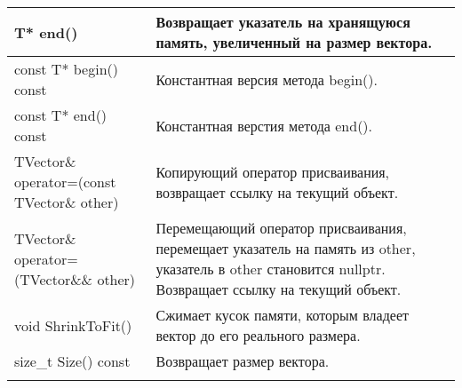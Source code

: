 \begin{longtable}{|p{7.5cm}|p{7.5cm}|}
\hline 
T* end()& Возвращает указатель на хранящуюся память, увеличенный на размер вектора.\\
\hline 
const T* begin() const& Константная версия метода begin().\\
\hline
const T* end() const& Константная верстия метода end().\\
\hline 
TVector\& operator=(const TVector\& other) & Копирующий оператор присваивания, возвращает ссылку на текущий объект.\\
\hline
TVector\& operator=(TVector\&\& other)& Перемещающий оператор присваивания, перемещает указатель на память из other, указатель в other становится nullptr. Возвращает ссылку на текущий объект.\\
\hline 
void ShrinkToFit()& Сжимает кусок памяти, которым владеет вектор до его реального размера.\\
\hline
size\_t Size() const & Возвращает размер вектора.\\
\hline
\rowcolor{lightgray}
\end{longtable}



